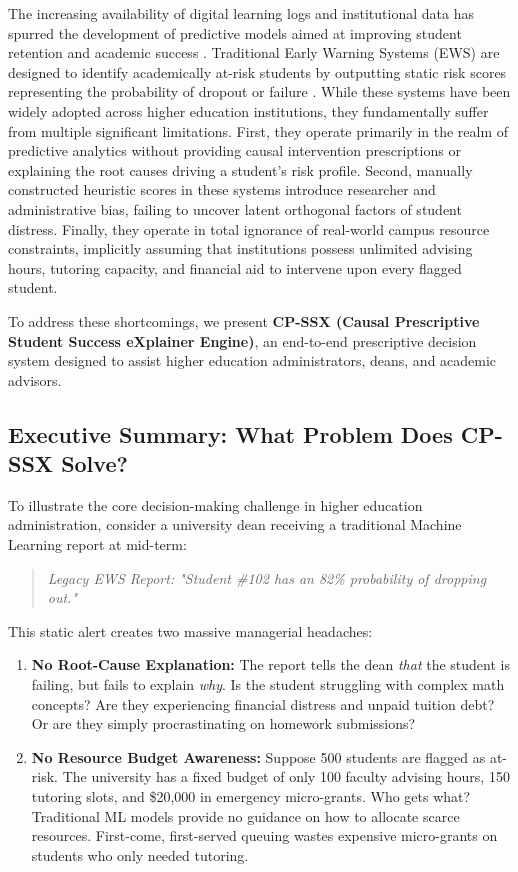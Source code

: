 \documentclass[11pt, a4paper]{article}
\begin{document}
The increasing availability of digital learning logs and institutional data has spurred the development of predictive models aimed at improving student retention and academic success \cite{arnold2012course}. Traditional Early Warning Systems (EWS) are designed to identify academically at-risk students by outputting static risk scores representing the probability of dropout or failure \cite{jayaprakash2014early}. While these systems have been widely adopted across higher education institutions, they fundamentally suffer from multiple significant limitations. First, they operate primarily in the realm of predictive analytics without providing causal intervention prescriptions or explaining the root causes driving a student's risk profile. Second, manually constructed heuristic scores in these systems introduce researcher and administrative bias, failing to uncover latent orthogonal factors of student distress. Finally, they operate in total ignorance of real-world campus resource constraints, implicitly assuming that institutions possess unlimited advising hours, tutoring capacity, and financial aid to intervene upon every flagged student.

To address these shortcomings, we present \textbf{CP-SSX (Causal Prescriptive Student Success eXplainer Engine)}, an end-to-end prescriptive decision system designed to assist higher education administrators, deans, and academic advisors. 

\subsection{Executive Summary: What Problem Does CP-SSX Solve?}
To illustrate the core decision-making challenge in higher education administration, consider a university dean receiving a traditional Machine Learning report at mid-term:
\begin{quote}
\textit{Legacy EWS Report: "Student \#102 has an 82\% probability of dropping out."}
\end{quote}
This static alert creates two massive managerial headaches:
\begin{enumerate}
    \item \textbf{No Root-Cause Explanation:} The report tells the dean \textit{that} the student is failing, but fails to explain \textit{why}. Is the student struggling with complex math concepts? Are they experiencing financial distress and unpaid tuition debt? Or are they simply procrastinating on homework submissions?
    \item \textbf{No Resource Budget Awareness:} Suppose 500 students are flagged as at-risk. The university has a fixed budget of only 100 faculty advising hours, 150 tutoring slots, and \$20,000 in emergency micro-grants. Who gets what? Traditional ML models provide no guidance on how to allocate scarce resources. First-come, first-served queuing wastes expensive micro-grants on students who only needed tutoring.
\end{enumerate}
\end{document}
